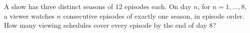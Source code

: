 A show has three distinct seasons of 12 episodes each. On day $n$, for $n=1,\ldots,8$, a viewer watches $n$ consecutive episodes of exactly one season, in episode order. How many viewing schedules cover every episode by the end of day 8?
